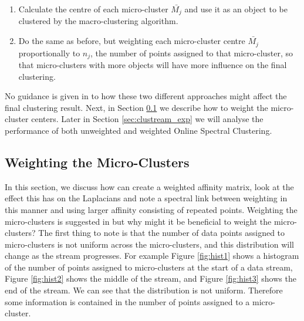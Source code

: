 \begin{enumerate}
\item Calculate the centre of each micro-cluster $\bar{M_j}$ and use it as an object to be clustered by the macro-clustering algorithm.
\item Do the same as before, but weighting each micro-cluster centre $\bar{M_j}$ proportionally to $n_j$, the number of points assigned to that micro-cluster, so that micro-clusters with more objects will have more influence on the final clustering.
\end{enumerate}

No guidance is given in \cite{Zhang1996a} to how these two different approaches might affect the final clustering result. Next, in Section \ref{sec:weighting} we describe how to weight the micro-cluster centers. Later in Section \ref{sec:clustream_exp} we will analyse the performance of both unweighted and weighted Online Spectral Clustering.

\subsection{Weighting the Micro-Clusters}
\label{sec:weighting}

In this section, we discuss how can create a weighted affinity matrix, look at the effect this has on the Laplacians and note a spectral link between weighting in this manner and using larger affinity consisting of repeated points.
Weighting the micro-clusters is suggested in \cite{Zhang1996a} but why might it be beneficial to weight the micro-clusters?  The first thing to note is that the number of data points assigned to micro-clusters is not uniform across the micro-clusters, and this distribution will change as the stream progresses.  For example Figure \ref{fig:hist1} shows a histogram of the number of points assigned to micro-clusters at the start of a data stream, Figure \ref{fig:hist2} shows the middle of the stream, and Figure \ref{fig:hist3} shows the end of the stream. We can see that the distribution is not uniform. Therefore some information is contained in the number of points assigned to a micro-cluster. 

